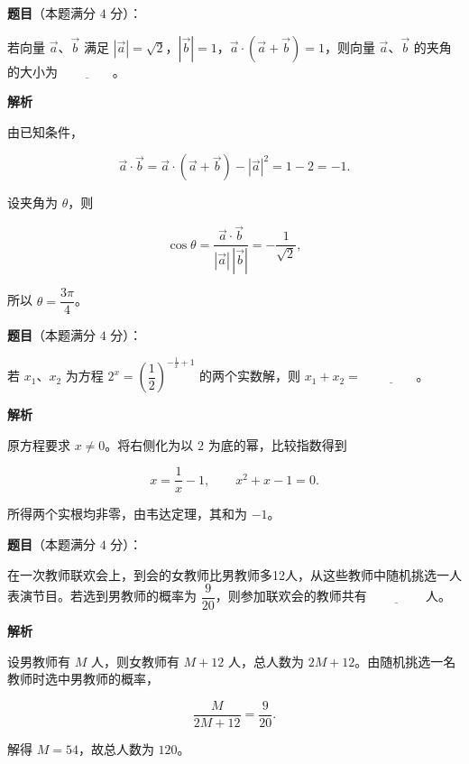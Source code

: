 \begin{answer}

\textbf{题目}（本题满分 $4$ 分）：

若向量 $\vec a$、$\vec b$ 满足 $|\vec a|=\sqrt2$，$|\vec b|=1$，$\vec a\cdot(\vec a+\vec b)=1$，则向量 $\vec a$、$\vec b$ 的夹角的大小为 $\underline{\qquad\qquad}$。

\textbf{解析}

由已知条件，

\nopagebreak[4]
\[
\vec a\cdot\vec b
=\vec a\cdot(\vec a+\vec b)-|\vec a|^2
=1-2=-1.
\]

设夹角为 $\theta$，则

\nopagebreak[4]
\[
\cos\theta=\frac{\vec a\cdot\vec b}{|\vec a|\,|\vec b|}
=-\frac1{\sqrt2},
\]

所以 $\theta=\dfrac{3\pi}{4}$。


\end{answer}
\begin{answer}

\textbf{题目}（本题满分 $4$ 分）：

若 $x_1$、$x_2$ 为方程 $2^x=\left(\dfrac12\right)^{-\frac1x+1}$ 的两个实数解，则 $x_1+x_2=$ $\underline{\qquad\qquad}$。

\textbf{解析}

原方程要求 $x\ne0$。将右侧化为以 $2$ 为底的幂，比较指数得到

\nopagebreak[4]
\[
x=\frac1x-1,
\qquad x^2+x-1=0.
\]

所得两个实根均非零，由韦达定理，其和为 $-1$。


\end{answer}
\begin{answer}

\textbf{题目}（本题满分 $4$ 分）：

在一次教师联欢会上，到会的女教师比男教师多12人，从这些教师中随机挑选一人表演节目。若选到男教师的概率为 $\dfrac9{20}$，则参加联欢会的教师共有 $\underline{\qquad\qquad}$ 人。

\textbf{解析}

设男教师有 $M$ 人，则女教师有 $M+12$ 人，总人数为 $2M+12$。由随机挑选一名教师时选中男教师的概率，

\nopagebreak[4]
\[
\frac{M}{2M+12}=\frac9{20}.
\]

解得 $M=54$，故总人数为 $120$。


\end{answer}
